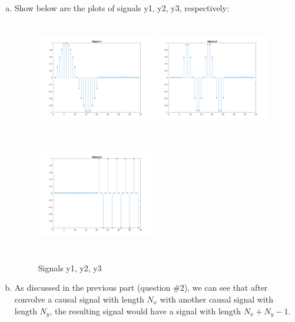 \documentclass[a4paper]{article}
\begin{document}
\begin{spacing}{2.0}
\begin{enumerate}[(a)]
\item Show below are the plots of signals y1, y2, y3, respectively:
\begin{figure} [H]
\centering
\includegraphics[width=2in,height=2in]{signaly1.png}
\includegraphics[width=2in,height=2in]{signaly2.png}
\includegraphics[width=2in,height=2in]{signaly3.png}
\caption{Signals y1, y2, y3}
\label{fig:graph}
\end{figure}

\item As discussed in the previous part (question \#2), we can see that after convolve a causal signal with length $N_x$ with another causal signal with length $N_y$, the resulting signal would have a signal with length $N_x+N_y-1$.

\end{enumerate}


\end{spacing}
\end{document}
